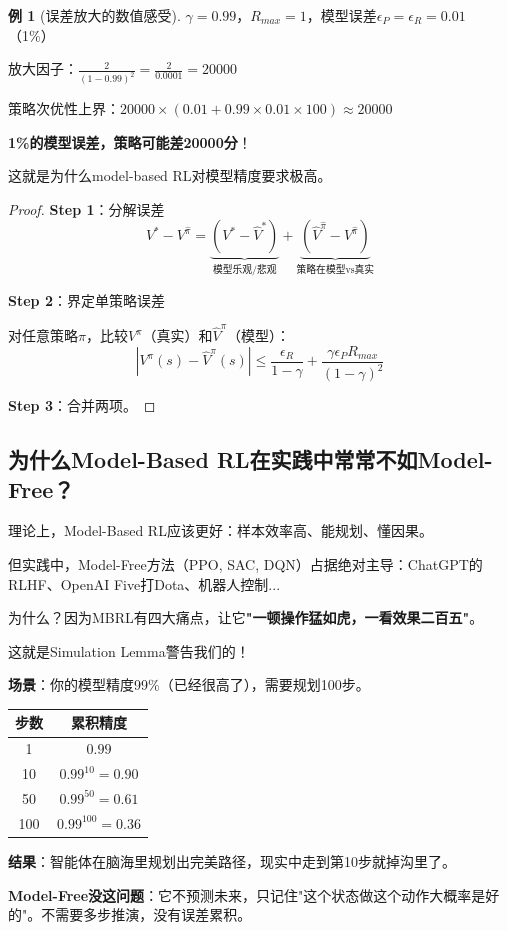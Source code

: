 \documentclass[11pt,a4paper]{article}
\theoremstyle{definition}
\newtheorem{example}{例}[section]
\begin{document}
\begin{example}[误差放大的数值感受]
$\gamma = 0.99$，$R_{max} = 1$，模型误差$\epsilon_P = \epsilon_R = 0.01$（1\%）

放大因子：$\frac{2}{(1-0.99)^2} = \frac{2}{0.0001} = 20000$

策略次优性上界：$20000 \times (0.01 + 0.99 \times 0.01 \times 100) \approx 20000$

\textbf{1\%的模型误差，策略可能差20000分}！

这就是为什么model-based RL对模型精度要求极高。
\end{example}

\begin{proof}
\textbf{Step 1}：分解误差
\[
V^* - V^{\hat{\pi}} = \underbrace{(V^* - \hat{V}^*)}_{\text{模型乐观/悲观}} + \underbrace{(\hat{V}^{\hat{\pi}} - V^{\hat{\pi}})}_{\text{策略在模型vs真实}}
\]

\textbf{Step 2}：界定单策略误差

对任意策略$\pi$，比较$V^\pi$（真实）和$\hat{V}^\pi$（模型）：
\[
|V^\pi(s) - \hat{V}^\pi(s)| \leq \frac{\epsilon_R}{1-\gamma} + \frac{\gamma \epsilon_P R_{max}}{(1-\gamma)^2}
\]

\textbf{Step 3}：合并两项。
\end{proof}

\subsection{为什么Model-Based RL在实践中常常不如Model-Free？}

\begin{plainwords}[一个尖锐的观察]
理论上，Model-Based RL应该更好：样本效率高、能规划、懂因果。

但实践中，Model-Free方法（PPO, SAC, DQN）占据绝对主导：ChatGPT的RLHF、OpenAI Five打Dota、机器人控制...

为什么？因为MBRL有四大痛点，让它\textbf{"一顿操作猛如虎，一看效果二百五"}。
\end{plainwords}

\begin{keypoint}
这就是Simulation Lemma警告我们的！

\textbf{场景}：你的模型精度99\%（已经很高了），需要规划100步。

\begin{center}
\begin{tabular}{c|c}
\toprule
步数 & 累积精度 \\
\midrule
1 & $0.99$ \\
10 & $0.99^{10} = 0.90$ \\
50 & $0.99^{50} = 0.61$ \\
100 & $0.99^{100} = 0.36$ \\
\bottomrule
\end{tabular}
\end{center}

\textbf{结果}：智能体在脑海里规划出完美路径，现实中走到第10步就掉沟里了。

\textbf{Model-Free没这问题}：它不预测未来，只记住"这个状态做这个动作大概率是好的"。不需要多步推演，没有误差累积。
\end{keypoint}
\end{document}
